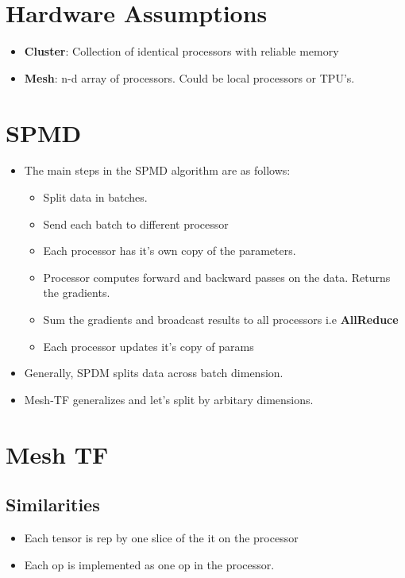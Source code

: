 \documentclass[a4paper]{article}
\begin{document}
\section{Hardware Assumptions}
\begin{itemize}
    \item \textbf{Cluster}: Collection of identical processors with reliable memory  
    \item \textbf{Mesh}: n-d array of processors. Could be local processors or TPU's. 
\end{itemize}

\section{SPMD}
\begin{itemize}
    \item The main steps in the SPMD algorithm are as follows:
    \begin{itemize}
        \item Split data in batches. 
        \item Send each batch to different processor
        \item Each processor has it's own copy of the parameters.
        \item Processor computes forward and backward passes on the data. Returns the gradients.
        \item Sum the gradients and broadcast results to all processors i.e \textbf{AllReduce}  
        \item Each processor updates it's copy of params
    \end{itemize}
    \item Generally, SPDM splits data across batch dimension.
    \item Mesh-TF generalizes and let's split by arbitary dimensions.
\end{itemize}
\section{Mesh TF}
\subsection{Similarities}
\begin{itemize}
    \item Each tensor is rep by one slice of the it on the processor
    \item Each op is implemented as one op in the processor. 
\end{itemize}
\end{document}
